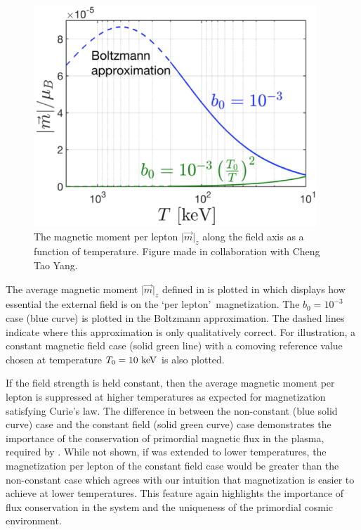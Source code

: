 \begin{figure}[h]
 \centering
 \includegraphics[clip, trim=0.0cm 0.0cm 0.0cm 0.0cm,width=0.95\textwidth]{plots/chap04cosmo/thesis_perlepton.png}
 \caption{The magnetic moment per lepton $\vert\vec{m}\vert_{z}$ along the field axis as a function of temperature. Figure made in collaboration with Cheng Tao Yang.}
 \label{fig:momentperlepton}
\end{figure}

The average magnetic moment $\vert\vec{m}\vert_{z}$ defined in  is plotted in  which displays how essential the external field is on the \lq per lepton\rq\ magnetization. The $b_{0}=10^{-3}$ case (blue curve) is plotted in the Boltzmann approximation. The dashed lines indicate where this approximation is only qualitatively correct. For illustration, a constant magnetic field case (solid green line) with a comoving reference value chosen at temperature $T_{0}=10\text{ keV}$ is also plotted.

If the field strength is held constant, then the average magnetic moment per lepton is suppressed at higher temperatures as expected for magnetization satisfying Curie's law. The difference in  between the non-constant (blue solid curve) case and the constant field (solid green curve) case demonstrates the importance of the conservation of primordial magnetic flux in the plasma, required by . While not shown, if  was extended to lower temperatures, the magnetization per lepton of the constant field case would be greater than the non-constant case which agrees with our intuition that magnetization is easier to achieve at lower temperatures. This feature again highlights the importance of flux conservation in the system and the uniqueness of the primordial cosmic environment.

